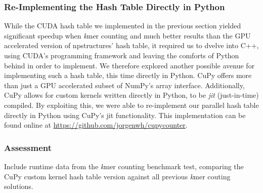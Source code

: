 \subsubsection{Re-Implementing the Hash Table Directly in Python} \label{methods:gpu_accelerating_kmer_counting_jit}
While the CUDA hash table we implemented in the previous section yielded significant speedup when \textit{k}mer counting and much better results than the GPU accelerated version of npstructures' hash table, it required us to dvelve into C++, using CUDA's programming framework and leaving the comforts of Python behind in order to implement.
We therefore explored another possible avenue for implementing such a hash table, this time directly in Python.
CuPy offers more than just a GPU accelerated subset of NumPy's array interface.
Additionally, CuPy allows for custom kernels written directly in Python, to be \textit{jit} (just-in-time) compiled.
By exploiting this, we were able to re-implement our parallel hash table directly in Python using CuPy's jit functionality.
This implementation can be found online at \url{https://github.com/jorgenwh/cupycounter}.

\subsubsection{Assessment}
Include runtime data from the \textit{k}mer counting benchmark test, comparing the CuPy custom kernel hash table version against all previous \textit{k}mer couting solutions.
